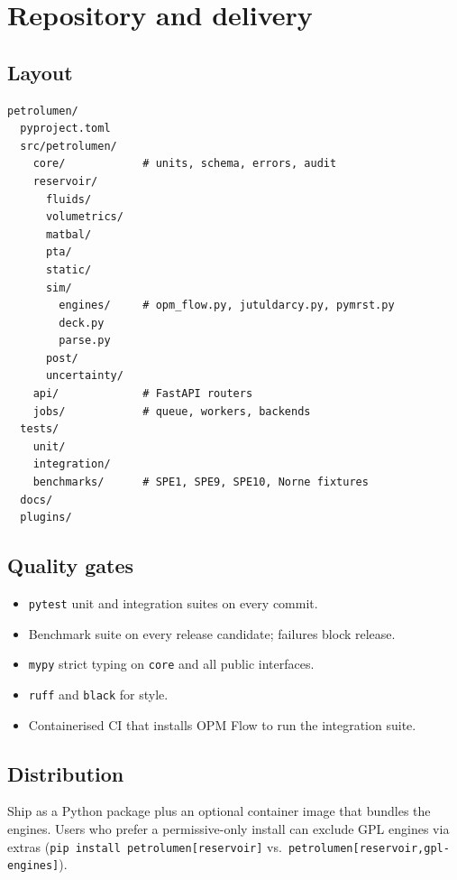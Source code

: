 \documentclass[11pt,a4paper]{article}
\begin{document}
\section{Repository and delivery}

\subsection{Layout}
\begin{lstlisting}[style=txt, caption={Suggested repository layout.}]
petrolumen/
  pyproject.toml
  src/petrolumen/
    core/            # units, schema, errors, audit
    reservoir/
      fluids/
      volumetrics/
      matbal/
      pta/
      static/
      sim/
        engines/     # opm_flow.py, jutuldarcy.py, pymrst.py
        deck.py
        parse.py
      post/
      uncertainty/
    api/             # FastAPI routers
    jobs/            # queue, workers, backends
  tests/
    unit/
    integration/
    benchmarks/      # SPE1, SPE9, SPE10, Norne fixtures
  docs/
  plugins/
\end{lstlisting}

\subsection{Quality gates}
\begin{itemize}[leftmargin=1.4em]
  \item \texttt{pytest} unit and integration suites on every commit.
  \item Benchmark suite on every release candidate; failures block release.
  \item \texttt{mypy} strict typing on \texttt{core} and all public interfaces.
  \item \texttt{ruff} and \texttt{black} for style.
  \item Containerised CI that installs OPM Flow to run the integration suite.
\end{itemize}

\subsection{Distribution}
Ship as a Python package plus an optional container image that bundles the
engines. Users who prefer a permissive-only install can exclude GPL engines
via extras (\texttt{pip install petrolumen[reservoir]} vs.\
\texttt{petrolumen[reservoir,gpl-engines]}).
\end{document}
